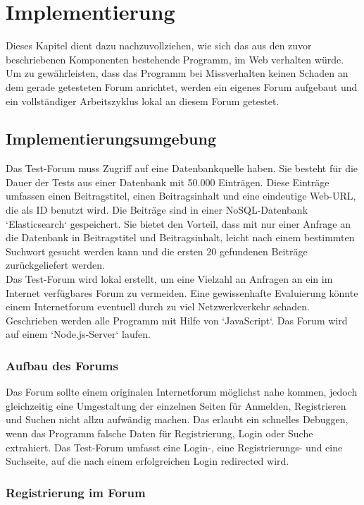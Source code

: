 \section{Implementierung}
Dieses Kapitel dient dazu nachzuvollziehen, wie sich das aus den zuvor beschriebenen Komponenten bestehende Programm, im Web verhalten würde. Um zu gewährleisten, dass das Programm bei Missverhalten keinen Schaden an dem gerade getesteten Forum anrichtet, werden ein eigenes Forum aufgebaut und ein vollständiger Arbeitszyklus lokal an diesem Forum getestet.

\subsection{Implementierungsumgebung}
Das Test-Forum muss Zugriff auf eine Datenbankquelle haben. Sie besteht für die Dauer der Tests aus einer Datenbank mit 50.000 Einträgen. Diese Einträge umfassen einen Beitragstitel, einen Beitragsinhalt und eine eindeutige Web-URL, die als ID benutzt wird. Die Beiträge sind in einer NoSQL-Datenbank `Elasticsearch` gespeichert. Sie bietet den Vorteil, dass mit nur einer Anfrage an die Datenbank in Beitragstitel und Beitragsinhalt, leicht nach einem bestimmten Suchwort gesucht werden kann und die ersten 20 gefundenen Beiträge zurückgeliefert werden.\\
Das Test-Forum wird lokal erstellt, um eine Vielzahl an Anfragen an ein im Internet verfügbares Forum zu vermeiden. Eine gewissenhafte Evaluierung könnte einem Internetforum eventuell durch zu viel Netzwerkverkehr schaden.\\
Geschrieben werden alle Programm mit Hilfe von `JavaScript`. Das Forum wird auf einem `Node.js-Server` laufen. 

\subsubsection{Aufbau des Forums}
Das Forum sollte einem originalen Internetforum möglichst nahe kommen, jedoch gleichzeitig eine Umgestaltung der einzelnen Seiten für Anmelden, Registrieren und Suchen nicht allzu aufwändig machen. Das erlaubt ein schnelles Debuggen, wenn das Programm falsche Daten für Registrierung, Login oder Suche extrahiert. Das Test-Forum umfasst eine Login-, eine Registrierungs- und eine Suchseite, auf die nach einem erfolgreichen Login redirected wird.

\subsubsection{Registrierung im Forum}

